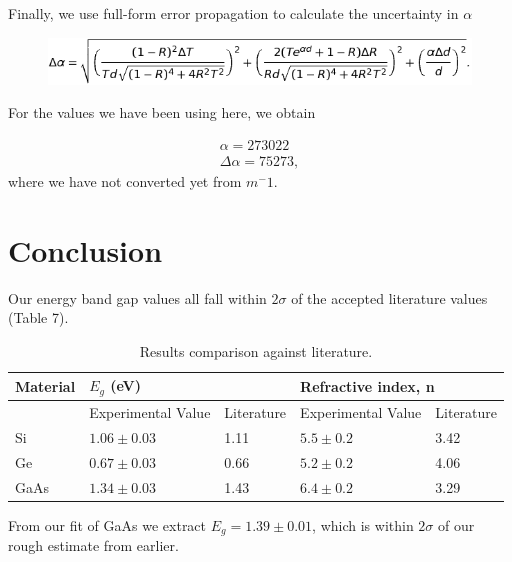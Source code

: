 \documentclass{article}
\begin{document}
Finally, we use full-form error propagation \cite{taylor} to calculate the uncertainty in $\alpha$

\begin{figure}[!htb]
	\centering
	\includegraphics[scale=.5]{plots/eqn_13.png}
 	\label{da}
\end{figure}

For the values we have been using here, we obtain

\begin{gather}
	\alpha =  273022 \\
	\Delta \alpha = 75273,
\end{gather}
where we have not converted yet from $m^-1$.

\section{Conclusion}

Our energy band gap values all fall within $2\sigma$ of the accepted literature values (Table 7).

\begin{table}[]
\centering
\caption{Results comparison against literature.}
\label{my-label}
\begin{tabular}{@{}lllll@{}}
\toprule
Material & \multicolumn{2}{l}{$E_g$ (eV)}  & \multicolumn{2}{l}{Refractive index, n} \\ \midrule
         & Experimental Value & Literature \cite{gaps} & Experimental Value     & Literature  \cite{refractive}   \\
Si       & $1.06 \pm 0.03$    & 1.11       & $5.5 \pm 0.2$          & 3.42           \\
Ge       & $0.67 \pm 0.03$    & 0.66       & $5.2 \pm 0.2$          & 4.06           \\
GaAs     & $1.34 \pm 0.03$    & 1.43       & $6.4 \pm 0.2$          & 3.29           \\ \bottomrule
\end{tabular}
\end{table}

From our fit of GaAs we extract $E_g = 1.39 \pm 0.01$, which is within $2\sigma$ of our rough estimate from earlier.

\hspace{.25cm}
\end{document}
